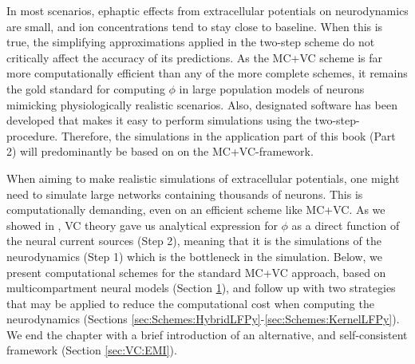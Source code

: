In most scenarios, ephaptic effects from extracellular potentials on neurodynamics are small, and ion concentrations tend to stay close to baseline. When this is true, the simplifying approximations applied in the two-step scheme do not critically affect the accuracy of its predictions. As the MC+VC scheme is far more computationally efficient than any of the more complete schemes, it remains the gold standard for computing $\phi$ in large population models of neurons mimicking physiologically realistic scenarios. Also, designated software has been developed that makes it easy to perform simulations using the two-step-procedure. Therefore, the simulations in the application part of this book (Part 2) will predominantly be based on on the MC+VC-framework.

When aiming to make realistic simulations of extracellular potentials, one might need to simulate large networks containing thousands of neurons. This is computationally demanding, even on an efficient scheme like MC+VC. 
As we showed in , 
VC theory gave us  analytical expression for $\phi$ as a direct function of the neural current sources (Step 2), meaning that it is  the simulations of the neurodynamics (Step 1) which is the bottleneck in the simulation. Below, we present computational schemes for the standard MC+VC approach, based on multicompartment neural models (Section \ref{sec:Schemes:LFPy}), and follow up with two strategies that may be applied to reduce the computational cost when computing the neurodynamics (Sections \ref{sec:Schemes:HybridLFPy}-\ref{sec:Schemes:KernelLFPy}). We end the chapter with a brief introduction of an alternative, and self-consistent framework (Section \ref{sec:VC:EMI}).





\section{\ehnote{}}
\label{sec:Schemes:LFPy}


